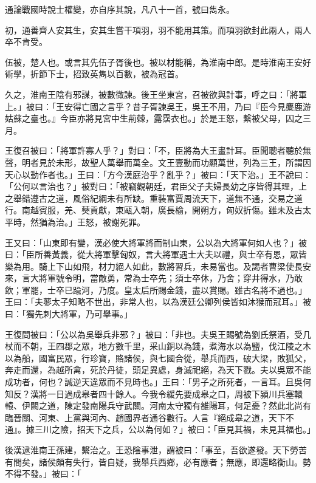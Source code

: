 \begin{pinyinscope}
通論戰國時說士權變，亦自序其說，凡八十一首，號曰雋永。

初，通善齊人安其生，安其生嘗干項羽，羽不能用其策。而項羽欲封此兩人，兩人卒不肯受。

伍被，楚人也。或言其先伍子胥後也。被以材能稱，為淮南中郎。是時淮南王安好術學，折節下士，招致英雋以百數，被為冠首。

久之，淮南王陰有邪謀，被數微諫。後王坐東宮，召被欲與計事，呼之曰：「將軍上。」被曰：「王安得亡國之言乎？昔子胥諫吳王，吳王不用，乃曰『臣今見麋鹿游姑蘇之臺也。』今臣亦將見宮中生荊棘，露霑衣也。」於是王怒，繫被父母，囚之三月。

王復召被曰：「將軍許寡人乎？」對曰：「不，臣將為大王畫計耳。臣聞聰者聽於無聲，明者見於未形，故聖人萬舉而萬全。文王壹動而功顯萬世，列為三王，所謂因天心以動作者也。」王曰：「方今漢庭治乎？亂乎？」被曰：「天下治。」王不說曰：「公何以言治也？」被對曰：「被竊觀朝廷，君臣父子夫婦長幼之序皆得其理，上之舉錯遵古之道，風俗紀綱未有所缺。重裝富賈周流天下，道無不通，交易之道行。南越賓服，羌、僰貢獻，東甌入朝，廣長榆，開朔方，匈奴折傷。雖未及古太平時，然猶為治。」王怒，被謝死罪。

王又曰：「山東即有變，漢必使大將軍將而制山東，公以為大將軍何如人也？」被曰：「臣所善黃義，從大將軍擊匈奴，言大將軍遇士大夫以禮，與士卒有恩，眾皆樂為用。騎上下山如飛，材力絕人如此，數將習兵，未易當也。及謁者曹梁使長安來，言大將軍號令明，當敵勇，常為士卒先；須士卒休，乃舍；穿井得水，乃敢飲；軍罷，士卒已踰河，乃度。皇太后所賜金錢，盡以賞賜。雖古名將不過也。」王曰：「夫蓼太子知略不世出，非常人也，以為漢廷公卿列侯皆如沐猴而冠耳。」被曰：「獨先刺大將軍，乃可舉事。」

王復問被曰：「公以為吳舉兵非邪？」被曰：「非也。夫吳王賜號為劉氏祭酒，受几杖而不朝，王四郡之眾，地方數千里，采山銅以為錢，煮海水以為鹽，伐江陵之木以為船，國富民眾，行珍寶，賂諸侯，與七國合從，舉兵而西，破大梁，敗狐父，奔走而還，為越所禽，死於丹徒，頭足異處，身滅祀絕，為天下戮。夫以吳眾不能成功者，何也？誠逆天違眾而不見時也。」王曰：「男子之所死者，一言耳。且吳何知反？漢將一日過成皋者四十餘人。今我令緩先要成皋之口，周被下潁川兵塞轘轅、伊闕之道，陳定發南陽兵守武關。河南太守獨有雒陽耳，何足憂？然此北尚有臨晉關、河東、上黨與河內、趙國界者通谷數行。人言『絕成皋之道，天下不通』。據三川之險，招天下之兵，公以為何如？」被曰：「臣見其禍，未見其福也。」

後漢逮淮南王孫建，繫治之。王恐陰事泄，謂被曰：「事至，吾欲遂發。天下勞苦有間矣，諸侯頗有失行，皆自疑，我舉兵西鄉，必有應者；無應，即還略衡山。勢不得不發。」被曰：「


\end{pinyinscope}
